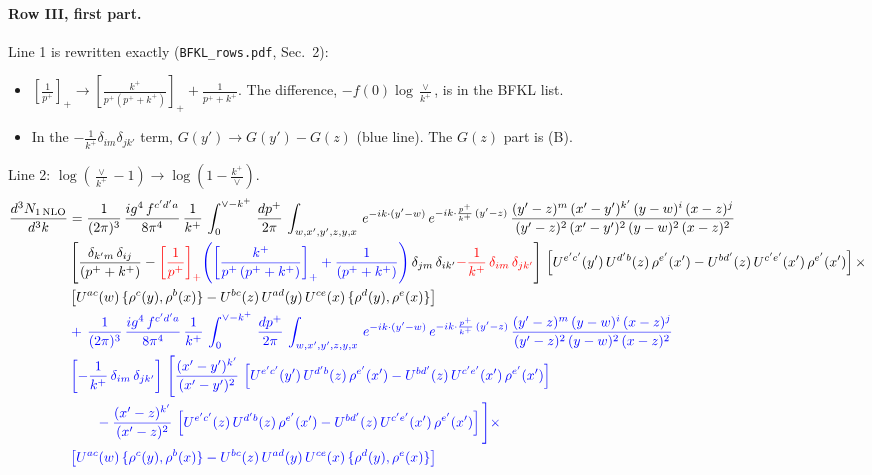 \documentclass[10pt]{article}
\numberwithin{equation}{section}
\newcommand{\new}[1]{{\color{blue}#1}}
\newcommand{\old}[1]{{\color{red}#1}}
\newcommand{\nc}{\color{blue}}
\begin{document}
\paragraph{Row III, first part.}
Line 1 is rewritten exactly (\texttt{BFKL\_rows.pdf}, Sec.~2):
\begin{itemize}
\item $\left[\frac{1}{p^+}\right]_+\to\left[\frac{k^+}{p^+(p^++k^+)}\right]_++\frac{1}{p^++k^+}$. The difference, $-f(0)\log\frac{\vee}{k^+}$, is in the BFKL list.
\item In the $-\frac{1}{k^+}\delta_{im}\delta_{jk'}$ term, $G(y')\to G(y')-G(z)$ (\new{blue} line). The $G(z)$ part is (B).
\end{itemize}
Line 2: $\log(\frac{\vee}{k^+}-1)\to\log(1-\frac{k^+}{\vee})$.
\begin{align}
     \frac{d^{3}N_{1\,\rm NLO}}{d^{3}k} & =  \frac{1}{(2\pi)^{3}}\, \frac{ig^{4}\,f^{c'd'a}}{8\pi^{4}}\, \frac{1}{k^{+}}\,\int_{0}^{\vee-k^{+}}\,  \frac{dp^{+}}{2\pi}\, \int_{w,x',y',z,y,x}\, e^{-ik\cdot (y'-w)}\, e^{-ik\cdot \frac{p^{+}}{k^{+}}\,(y'-z)}\,\frac{(y'-z)^{m}\,(x'-y')^{k'}\,(y-w)^{i}\,(x-z)^{j}}{(y'-z)^{2}\,(x'-y')^{2}\,(y-w)^{2}\,(x-z)^{2}}\notag \\ & \left[\frac{\delta_{k'm}\,\delta_{ij}}{(p^{+}+k^{+})}-\old{\left[\frac{1}{p^{+}}\right]_{+}}\new{\left(\left[\frac{k^{+}}{p^{+}\,(p^{+}+k^{+})}\right]_{+}+\frac{1}{(p^{+}+k^{+})}\right)}\,\delta_{jm}\,\delta_{ik'}\old{-\frac{1}{k^{+}}\, \delta_{im}\, \delta_{jk'}}\right]\, \left[U^{e'c'}(y')\,U^{d'b}(z)\,\rho^{e'}(x')-U^{bd'}(z)\,U^{c'e'}(x')\,\rho^{e'}(x')\right]\times\notag \\ &  \left[U^{ac}(w)\, \{\rho^{c}(y),\rho^{b}(x)\}-U^{bc}(z)\,U^{ad}(y)\,U^{ce}(x)\,\{\rho^{d}(y),\rho^{e}(x)\}\right] \notag \\
& \nc  +\,\frac{1}{(2\pi)^{3}}\, \frac{ig^{4}\,f^{c'd'a}}{8\pi^{4}}\, \frac{1}{k^{+}}\,\int_{0}^{\vee-k^{+}}\,  \frac{dp^{+}}{2\pi}\, \int_{w,x',y',z,y,x}\, e^{-ik\cdot (y'-w)}\, e^{-ik\cdot \frac{p^{+}}{k^{+}}\,(y'-z)}\,\frac{(y'-z)^{m}\,(y-w)^{i}\,(x-z)^{j}}{(y'-z)^{2}\,(y-w)^{2}\,(x-z)^{2}}\notag \\ & \nc  \left[-\frac{1}{k^{+}}\, \delta_{im}\, \delta_{jk'}\right]\, \Bigg[\frac{(x'-y')^{k'}}{(x'-y')^{2}}\,\left[U^{e'c'}(y')\,U^{d'b}(z)\,\rho^{e'}(x')-U^{bd'}(z)\,U^{c'e'}(x')\,\rho^{e'}(x')\right]\notag \\ & \nc  \qquad-\frac{(x'-z)^{k'}}{(x'-z)^{2}}\,\left[U^{e'c'}(z)\,U^{d'b}(z)\,\rho^{e'}(x')-U^{bd'}(z)\,U^{c'e'}(x')\,\rho^{e'}(x')\right]\Bigg]\times\notag \\ & \nc   \left[U^{ac}(w)\, \{\rho^{c}(y),\rho^{b}(x)\}-U^{bc}(z)\,U^{ad}(y)\,U^{ce}(x)\,\{\rho^{d}(y),\rho^{e}(x)\}\right] \notag \\

\end{align}
\end{document}
